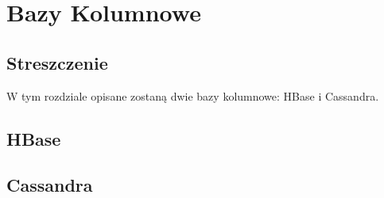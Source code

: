 \chapter{Bazy Kolumnowe}

\section*{Streszczenie}
W tym rozdziale opisane zostaną dwie bazy kolumnowe: HBase i Cassandra.

\section{HBase}
\label{sec:hbase}

\section{Cassandra}
\label{sec:cassandra}